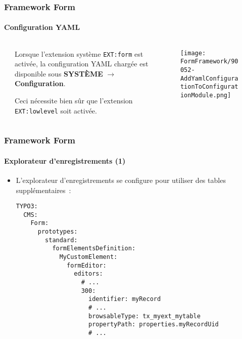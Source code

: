 
\begin{frame}[fragile]
	\frametitle{Framework Form}
	\framesubtitle{Configuration YAML}

	\begin{columns}[T]
		\begin{column}{.04\textwidth}
		\end{column}
		\begin{column}{.38\textwidth}

			Lorsque l'extension système \texttt{EXT:form} est activée, la configuration YAML chargée
			est disponible sous \textbf{SYSTÈME} $\rightarrow$ \textbf{Configuration}.

			\vspace{0.2cm}

			Ceci nécessite bien sûr que l'extension \texttt{EXT:lowlevel} soit activée.

		\end{column}
		\begin{column}{.58\textwidth}
			\vspace{-0.3cm}
			\begin{figure}
				\texttt{[image: FormFramework/90052-AddYamlConfigurationToConfigurationModule.png]}
			\end{figure}
		\end{column}
	\end{columns}

\end{frame}


\begin{frame}[fragile]
	\frametitle{Framework Form}
	\framesubtitle{Explorateur d'enregistrements (1)}

	\lstset{basicstyle=\tiny\ttfamily}

	\begin{itemize}
		\item L'explorateur d'enregistrements se configure pour utiliser des tables supplémentaires~:
\begin{lstlisting}
TYPO3:
  CMS:
    Form:
      prototypes:
        standard:
          formElementsDefinition:
            MyCustomElement:
              formEditor:
                editors:
                  # ...
                  300:
                    identifier: myRecord
                    # ...
                    browsableType: tx_myext_mytable
                    propertyPath: properties.myRecordUid
                    # ...
\end{lstlisting}

	\end{itemize}

\end{frame}

